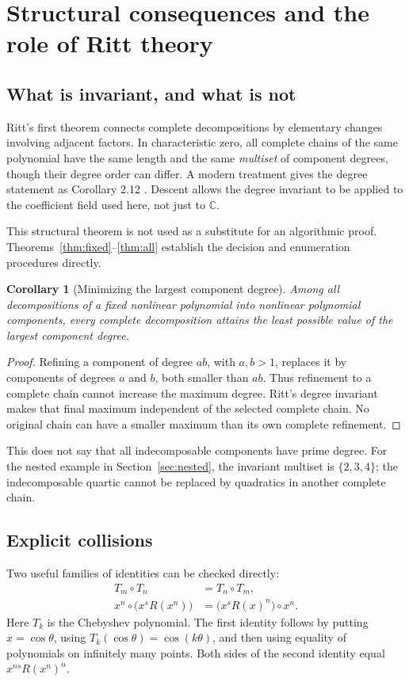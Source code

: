 \documentclass[11pt,letterpaper]{article}
\newtheorem{corollary}[theorem]{Corollary}
\theoremstyle{definition}
\theoremstyle{remark}
\newcommand{\C}{\mathbb C}
\begin{document}
\section{Structural consequences and the role of Ritt theory}
\label{sec:ritt}

\subsection{What is invariant, and what is not}
Ritt's first theorem connects complete decompositions by elementary
changes involving adjacent factors. In characteristic zero, all complete
chains of the same polynomial have the same length and the same
\emph{multiset} of component degrees, though their degree order can differ.
A modern treatment gives the degree statement as Corollary 2.12
\cite{zieve-mueller}. Descent allows the degree invariant to be applied to
the coefficient field used here, not just to $\C$.

This structural theorem is not used as a substitute for an algorithmic
proof. Theorems~\ref{thm:fixed}--\ref{thm:all} establish the decision and
enumeration procedures directly.

\begin{corollary}[Minimizing the largest component degree]\label{cor:minmax}
Among all decompositions of a fixed nonlinear polynomial into nonlinear
polynomial components, every complete decomposition attains the least
possible value of the largest component degree.
\end{corollary}

\begin{proof}
Refining a component of degree $ab$, with $a,b>1$, replaces it by
components of degrees $a$ and $b$, both smaller than $ab$. Thus refinement
to a complete chain cannot increase the maximum degree. Ritt's degree
invariant makes that final maximum independent of the selected complete
chain. No original chain can have a smaller maximum than its own complete
refinement.
\end{proof}

This does not say that all indecomposable components have prime degree.
For the nested example in Section~\ref{sec:nested}, the invariant
multiset is $\{2,3,4\}$; the indecomposable quartic cannot be replaced by
quadratics in another complete chain.

\subsection{Explicit collisions}
Two useful families of identities can be checked directly:
\begin{align}
 T_m\circ T_n&=T_n\circ T_m,\label{eq:cheb}\\
 x^n\circ\bigl(x^sR(x^n)\bigr)
 &=\bigl(x^sR(x)^n\bigr)\circ x^n.\label{eq:powercollision}
\end{align}
Here $T_k$ is the Chebyshev polynomial. The first identity follows by
putting $x=\cos\theta$, using $T_k(\cos\theta)=\cos(k\theta)$,
and then using equality of polynomials on infinitely many points.
Both sides of the second identity equal $x^{ns}R(x^n)^n$.
\end{document}
